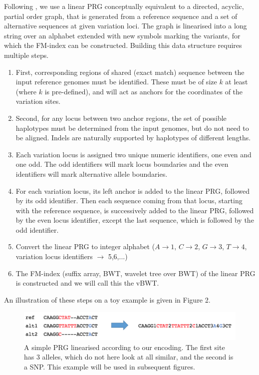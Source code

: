 \documentclass[runningheads,a4paper]{llncs}
\begin{document}
Following \cite{dilthey}, we use a linear PRG conceptually equivalent to a directed, acyclic, partial order graph, that is generated from a reference sequence and a set of alternative sequences at given variation loci. The graph is linearised into a long string over an alphabet extended with new symbols marking the variants, for which the FM-index can be constructed. Building this data structure requires multiple steps. 
\begin{enumerate}
\item First, corresponding regions of shared (exact match) sequence between the input reference genomes must be identified. These must be of size $k$ at least (where $k$ is pre-defined), and will act as anchors for the coordinates of the variation sites. 
\item Second, for any locus between two anchor regions, the set of possible haplotypes must be determined from the input genomes, but  do not need to be aligned. Indels are naturally supported by haplotypes of different lengths.
\item Each variation locus is assigned two unique numeric identifiers, one even and one odd. The odd identifiers will mark locus boundaries and the even identifiers will mark alternative allele boundaries.
\item For each variation locus, its left anchor is added to the linear PRG, followed by its odd identifier. Then each sequence coming from that locus, starting with the reference sequence, is successively added to the linear PRG, followed by the even locus identifier, except the last sequence, which is followed by the odd identifier.
\item Convert the linear PRG to integer alphabet ($A\rightarrow 1$, $C\rightarrow2$, $G\rightarrow3$, $T\rightarrow4$, variation locus identifiers $\rightarrow$ 5,6,...)
\item The FM-index (suffix array, BWT, wavelet tree over BWT) of the linear PRG is constructed and we will call this the vBWT.
\end{enumerate}

An illustration of these steps on a toy example is given in Figure 2.

\begin{figure}
\centering
\includegraphics[height=1.5cm]{linPRG}
\caption{A simple PRG linearised according to our encoding. The first site has 3 alleles, which do not here look at all similar, and the second is a SNP. This example will be used in subsequent figures.}
\label{lab}
\end{figure}
\end{document}
